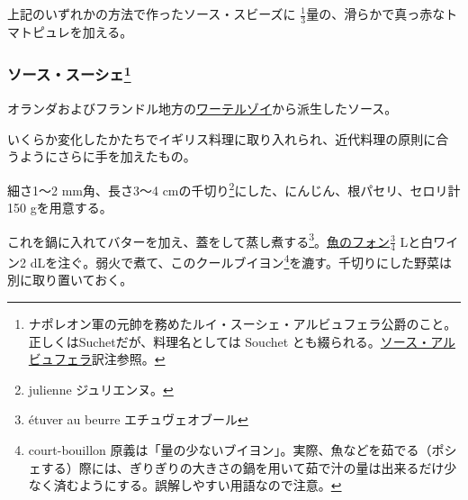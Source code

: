 \begin{recette}


上記のいずれかの方法で作ったソース・スビーズに
\(\frac{1}{3}\)量の、滑らかで真っ赤なトマトピュレを加える。

\hypertarget{sauce-souchet}{%
\subsubsection[ソース・スーシェ]{\texorpdfstring{ソース・スーシェ\footnote{ナポレオン軍の元帥を務めたルイ・スーシェ・アルビュフェラ公爵のこと。
  正しくはSuchetだが、料理名としては Souchet
  とも綴られる。\protect\hyperlink{sauce-albufera}{ソース・アルビュフェラ}訳注参照。}}{ソース・スーシェ}}\label{sauce-souchet}}



オランダおよびフランドル地方の\protect\hyperlink{}{ワーテルゾイ}から派生したソース。

いくらか変化したかたちでイギリス料理に取り入れられ、近代料理の原則に合うようにさらに手を加えたもの。

細さ1〜2 mm角、長さ3〜4 cmの千切り\footnote{julienne ジュリエンヌ。}にした、にんじん、根パセリ、セロリ計150
gを用意する。

これを鍋に入れてバターを加え、蓋をして蒸し煮する\footnote{étuver au
  beurre エチュヴェオブール}。\protect\hyperlink{fumet-de-poisson}{魚のフォン}\(\frac{3}{4}\)
Lと白ワイン2 dLを注ぐ。弱火で煮て、このクールブイヨン\footnote{court-bouillon
  原義は「量の少ないブイヨン」。実際、魚などを茹でる（ポシェする）際には、ぎりぎりの大きさの鍋を用いて茹で汁の量は出来るだけ少なく済むようにする。誤解しやすい用語なので注意。}を漉す。千切りにした野菜は別に取り置いておく。


\end{recette}
